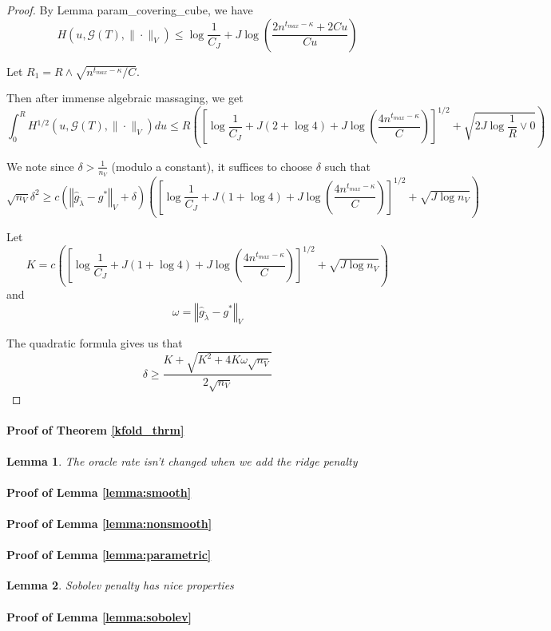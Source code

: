 \documentclass[12pt]{article}
\newtheorem{lemma}{Lemma}
\begin{document}
\begin{proof}
By Lemma param\_covering\_cube, we have
\[
H(u,\mathcal{G}(T),\|\cdot\|_{V})\le\log\frac{1}{C_{J}}+J\log\left(\frac{2n^{t_{max}-\kappa}+2Cu}{Cu}\right)
\]


Let $R_{1}=R\wedge\sqrt{n^{t_{max}-\kappa}/C}$.

Then after immense algebraic massaging, we get
\begin{equation}
\int_{0}^{R}H{}^{1/2}(u,\mathcal{G}(T),\|\cdot\|_{V})du
\le
R\left(\left[\log\frac{1}{C_{J}}+J(2+\log4)+J\log\left(\frac{4n^{t_{max}-\kappa}}{C}\right)\right]^{1/2}+\sqrt{2J\log\frac{1}{R}\vee0}\right)
\end{equation}

We note since $\delta > \frac{1}{n_{V}}$ (modulo a constant), it suffices to choose $\delta$ such that
\[
\sqrt{n_{V}}\delta^{2}\ge c\left(\left\Vert \hat{g}_{\tilde{\lambda}}-g^{*}\right\Vert _{V}+\delta\right)\left(\left[\log\frac{1}{C_{J}}+J(1+\log4)+J\log\left(\frac{4n^{t_{max}-\kappa}}{C}\right)\right]^{1/2}+\sqrt{J\log n_{V}}\right)
\]

Let
\[
K=c\left(\left[\log\frac{1}{C_{J}}+J(1+\log4)+J\log\left(\frac{4n^{t_{max}-\kappa}}{C}\right)\right]^{1/2}+\sqrt{J\log n_{V}}\right)
\]
and
\[
\omega=\left\Vert \hat{g}_{\tilde{\lambda}}-g^{*}\right\Vert _{V}
\]

The quadratic formula gives us that
\[
\delta\ge\frac{K+\sqrt{K^{2}+4K\omega\sqrt{n_{V}}}}{2\sqrt{n_{V}}}
\]
\end{proof}



\paragraph{Proof of Theorem \ref{kfold_thrm}}

\begin{lemma}
\label{oracle_maintained}
The oracle rate isn't changed when we add the ridge penalty
\end{lemma}

\paragraph{Proof of Lemma \ref{lemma:smooth}}
\paragraph{Proof of Lemma \ref{lemma:nonsmooth}}

\paragraph{Proof of Lemma \ref{lemma:parametric}}

\begin{lemma}
\label{lemma:sobolev_prop}
Sobolev penalty has nice properties
\end{lemma}

\paragraph{Proof of Lemma \ref{lemma:sobolev}}

\bigskip



\end{document}
